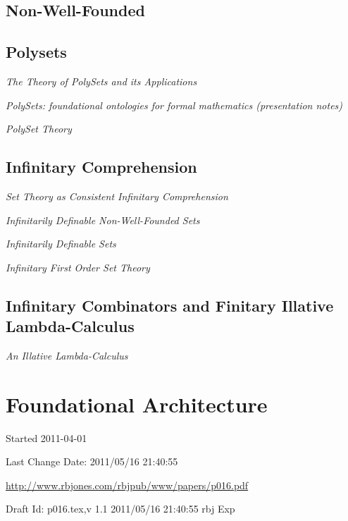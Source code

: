 \documentclass[10pt,titlepage]{book}
\begin{document}
\subsection{Non-Well-Founded}

\subsection{Polysets}

\emph{The Theory of PolySets and its Applications}\cite{jones06a}

\emph{PolySets: foundational ontologies for formal mathematics (presentation notes)}\cite{rbjn003}\cite{rbjo003}

\emph{PolySet Theory}\cite{rbj020}

\subsection{Infinitary Comprehension}

\emph{Set Theory as Consistent Infinitary Comprehension}\cite{rbjt021}

\emph{Infinitarily Definable Non-Well-Founded Sets}\cite{rbjt024}

\emph{Infinitarily Definable Sets}\cite{rbjt026}

\emph{Infinitary First Order Set Theory}\cite{rbjt027}

\subsection{Infinitary Combinators and Finitary Illative Lambda-Calculus}

\emph{An Illative Lambda-Calculus}\cite{rbjt041}

\section{Foundational Architecture}


\backmatter

%




\label{index}
{\twocolumn[]
{\small\printindex}}

\vfill

\tiny{
Started 2011-04-01

Last Change $ $Date: 2011/05/16 21:40:55 $ $

\href{http://www.rbjones.com/rbjpub/www/papers/p016.pdf}{http://www.rbjones.com/rbjpub/www/papers/p016.pdf}

Draft $ $Id: p016.tex,v 1.1 2011/05/16 21:40:55 rbj Exp $ $
}%
\end{document}
